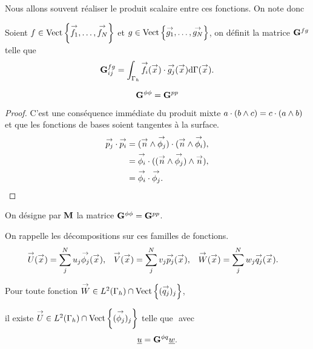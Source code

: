   Nous allons souvent réaliser le produit scalaire entre ces fonctions. On note donc
  \begin{defn}
    Soient \(f \in \Vect{\vect{f_1},\ldots,\vect{f_N}}\) et \(g \in \Vect{\vect{g_1},\ldots,\vect{g_N}}\), on définit la matrice \(\mG{f}{g}\) telle que
    \begin{equation*}
      \mG{f}{g}_{ij} = \int_{\Gamma_h} \vect{f_i}(\vx)\cdot \vect{g_j}(\vx) \dd{\Gamma}(\vx).
    \end{equation*}
  \end{defn}

  \begin{prop}
    \begin{equation*}
      \mG{\phi}{\phi} = \mG{p}{p}
    \end{equation*}
  \end{prop}
  \begin{proof}
    C'est une conséquence immédiate du produit mixte \(a\cdot (b \pvect c) = c\cdot (a \pvect b)\) et que les fonctions de bases soient tangentes à la surface.
    \[
      \begin{aligned}
        \pj \cdot \pii &= (\vn \pvect \phij) \cdot ( \vn \pvect \phii),
        \\
        &= \phii \cdot ( (\vn \pvect \phij) \pvect \vn),
        \\
        &= \phii \cdot \phij.
      \end{aligned}
    \]
  \end{proof}

  \begin{defn}
    On désigne par \(\mM\) la matrice \(\mG{\phi}{\phi} = \mG{p}{p}\).
  \end{defn}

  On rappelle les décompositions sur ces familles de fonctions.
  \begin{align*}
    \vect{U}(\vx) &= \sum_j^N  u_j \phij(\vx),
    &
    \vect{V}(\vx) &= \sum_j^N  v_j \pj(\vx),
    &
    \vect{W}(\vx) &= \sum_j^N  w_j \qj(\vx).
  \end{align*}

  \begin{prop}
    Pour toute fonction \(\vect{W} \in L^2(\Gamma_h)\cap\Vect{(\qj)_j}\),

    il existe \(\vect{U} \in L^2(\Gamma_h) \cap \Vect{(\phij)_j} \) telle que \(\) avec
    \begin{equation*}
      \comp{u} = \mG{\phi}{q}\comp{w}.
    \end{equation*}
  \end{prop}

